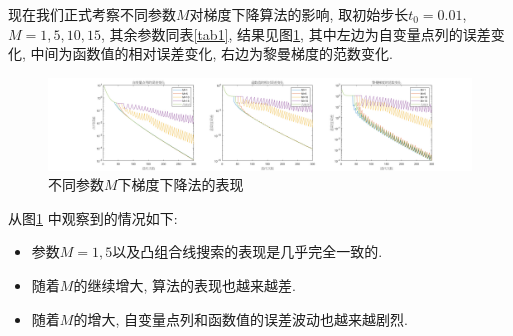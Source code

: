 \documentclass[UTF8]{ctexart}
\begin{document}




现在我们正式考察不同参数$M$对梯度下降算法的影响, 取初始步长$t_0=0.01$, $M=1,5,10,15$, 其余参数同表\ref{tab1}, 结果见图\ref{fig6}, 其中左边为自变量点列的误差变化, 中间为函数值的相对误差变化, 右边为黎曼梯度的范数变化. 

\begin{figure}[htb]
    \centering
    \includegraphics[width=\textwidth]{Q2-figure/6.png}
    \caption{不同参数$M$下梯度下降法的表现}\label{fig6}
\end{figure}

从图\ref{fig6} 中观察到的情况如下: 
\begin{itemize}
    \item 参数$M=1,5$以及凸组合线搜索的表现是几乎完全一致的. 
    \item 随着$M$的继续增大, 算法的表现也越来越差.
    \item 随着$M$的增大, 自变量点列和函数值的误差波动也越来越剧烈. 
\end{itemize}
\end{document}
